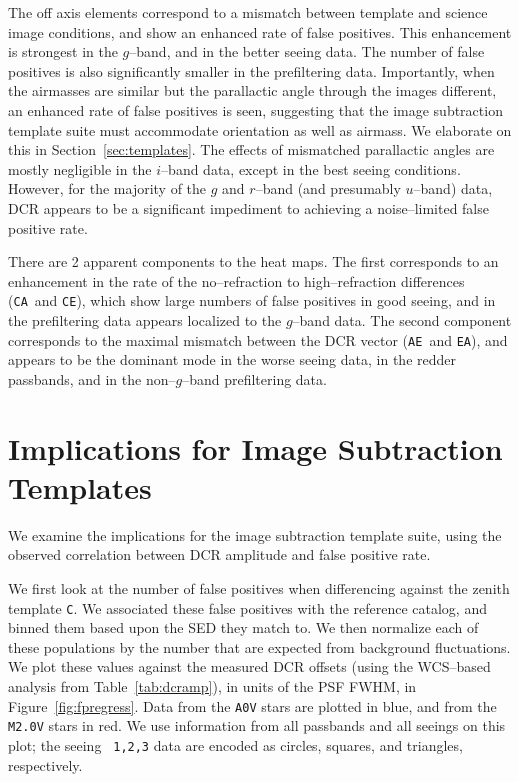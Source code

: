 \documentclass[prd, nofootinbib, floatfix, 11pt, tightenlines, times]{article}
\def\A{{\tt A}}
\def\C{{\tt C}}
\def\E{{\tt E}}
\begin{document}
The off axis elements correspond to a mismatch between template and
science image conditions, and show an enhanced rate of false
positives.  This enhancement is strongest in the $g$--band, and in the
better seeing data.  The number of false positives is also
significantly smaller in the prefiltering data.  Importantly, when the
airmasses are similar but the parallactic angle through the images
different, an enhanced rate of false positives is seen, suggesting
that the image subtraction template suite must accommodate orientation
as well as airmass.  We elaborate on this in
Section~\ref{sec:templates}.  The effects of mismatched parallactic
angles are mostly negligible in the $i$--band data, except in the best
seeing conditions.  However, for the majority of the $g$ and $r$--band
(and presumably $u$--band) data, DCR appears to be a significant
impediment to achieving a noise--limited false positive rate.

There are 2 apparent components to the heat maps.  The first
corresponds to an enhancement in the rate of the no--refraction to
high--refraction differences (\C\A\ and \C\E), which show large
numbers of false positives in good seeing, and in the prefiltering
data appears localized to the $g$--band data.  The second component
corresponds to the maximal mismatch between the DCR vector (\A\E\ and
\E\A), and appears to be the dominant mode in the worse seeing data,
in the redder passbands, and in the non--$g$--band prefiltering data.

\section{Implications for Image Subtraction Templates \label{sec:templates}}

We examine the implications for the image subtraction template suite,
using the observed correlation between DCR amplitude and false positive
rate.

We first look at the number of false positives when differencing
against the zenith template \C.  We associated these false positives
with the reference catalog, and binned them based upon the SED they
match to.  We then normalize each of these populations by the number
that are expected from background fluctuations.  We plot these values
against the measured DCR offsets (using the WCS--based analysis from
Table~\ref{tab:dcramp}), in units of the PSF FWHM, in
Figure~\ref{fig:fpregress}.  Data from the {\tt A0V} stars are plotted
in blue, and from the {\tt M2.0V} stars in red.  We use information
from all passbands and all seeings on this plot; the seeing {\tt
  1,2,3} data are encoded as circles, squares, and triangles,
respectively.
\end{document}

